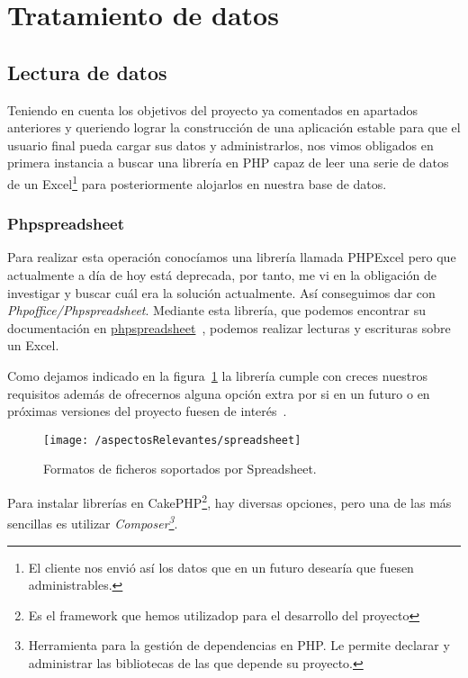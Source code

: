 
\section{Tratamiento de datos}

\subsection{Lectura de datos}

Teniendo en cuenta los objetivos del proyecto ya comentados en apartados anteriores y queriendo lograr la construcción de una aplicación estable para que el usuario final pueda cargar sus datos y administrarlos, nos vimos obligados en primera instancia a buscar una librería en PHP capaz de leer una serie de datos de un Excel\footnote{El cliente nos envió así los datos que en un futuro desearía que fuesen administrables.} para posteriormente alojarlos en nuestra base de datos.

\subsubsection{Phpspreadsheet}

Para realizar esta operación conocíamos una librería llamada PHPExcel pero que actualmente a día de hoy está deprecada, por tanto, me vi en la obligación de investigar y buscar cuál era la solución actualmente. Así conseguimos dar con \textit{Phpoffice/Phpspreadsheet}. Mediante esta librería, que podemos encontrar su documentación en \href{https://phpspreadsheet.readthedocs.io/en/develop/}{phpspreadsheet}~\cite{web:spreadsheet}, podemos realizar lecturas y escrituras sobre un Excel. 

Como dejamos indicado en la figura~\ref{fig:spreadsheet} la librería cumple con creces nuestros requisitos además de ofrecernos alguna opción extra por si en un futuro o en próximas versiones del proyecto fuesen de interés~\cite{web:spreadsheet}.

\begin{figure}[ht]
	\centering
	\texttt{[image: /aspectosRelevantes/spreadsheet]}
	\caption{Formatos de ficheros soportados por Spreadsheet.}
	\label{fig:spreadsheet}
\end{figure}

Para instalar librerías en CakePHP\footnote{Es el framework que hemos utilizadop para el desarrollo del proyecto}, hay diversas opciones, pero una de las más sencillas es utilizar \textit{Composer\footnote{Herramienta para la gestión de dependencias en PHP. Le permite declarar y administrar las bibliotecas de las que depende su proyecto.}}.

